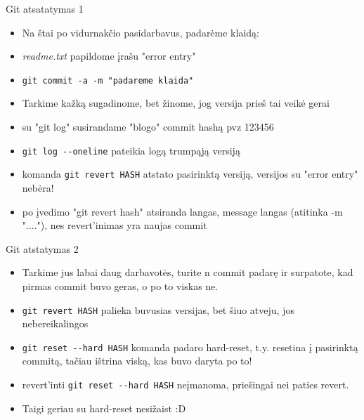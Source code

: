 \documentclass[11pt,xcolor=table]{beamer}
\begin{document}

\begin{frame}[fragile]{Git atsatatymas 1}
\begin{itemize}
\item Na štai po vidurnakčio pasidarbavus, padarėme klaidą:
\item \textit{readme.txt} papildome įrašu "error entry"
\item \colorbox{listinggray}{\lstinline|git commit -a -m "padareme klaida"|}
\item Tarkime kažką sugadinome, bet žinome, jog versija prieš tai veikė gerai
\item su "git log" susirandame "blogo" commit hashą  pvz 123456
\item \colorbox{listinggray}{\lstinline|git log --oneline|} pateikia logą trumpąją versiją
\item komanda \colorbox{listinggray}{\lstinline|git revert HASH|} atstato pasirinktą versiją, versijos su "error entry" nebėra!
\item po įvedimo "git revert hash" atsiranda langas, message langas (atitinka -m "...."), nes revert'inimas yra naujas commit
\end{itemize}
\end{frame}



\begin{frame}[fragile]{Git atstatymas 2}
\begin{itemize}
\item Tarkime jus labai daug darbavotės, turite n commit padarę ir surpatote, kad pirmas commit buvo geras, o po to viskas ne.
\item \colorbox{listinggray}{\lstinline|git revert HASH|} palieka buvusias versijas, bet šiuo atveju, jos nebereikalingos
\item \colorbox{listinggray}{\lstinline|git reset --hard HASH|} komanda padaro hard-reset, t.y. resetina į pasirinktą commitą, tačiau ištrina viską, kas buvo daryta po to! 
\item revert'inti \colorbox{listinggray}{\lstinline|git reset --hard HASH|} neįmanoma, priešingai nei paties revert.
\item Taigi geriau su hard-reset nesižaist :D
\end{itemize}
\end{frame}

\end{document}
